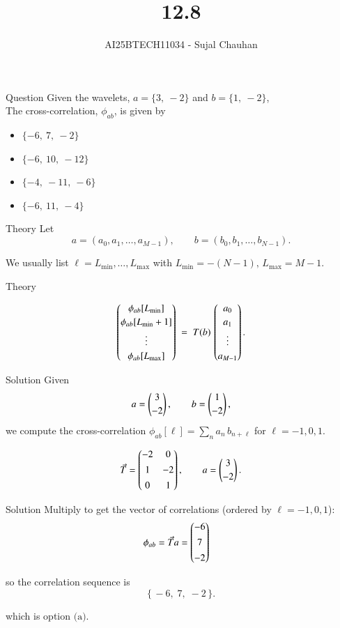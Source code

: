 \documentclass{beamer}
\title
{12.8}
\author 
{AI25BTECH11034 - Sujal Chauhan }
\begin{document}
\frame{\titlepage}
\begin{frame}{Question}
    Given the wavelets, $a = \{3,\ -2\}$ and $b = \{1,\ -2\}$,\\
The cross-correlation, $\phi_{ab}$, is given by

\begin{itemize}
  \item[(a)] $\{-6,\ 7,\ -2\}$
  \item[(b)] $\{-6,\ 10,\ -12\}$
  \item[(c)] $\{-4,\ -11,\ -6\}$
  \item[(d)] $\{-6,\ 11,\ -4\}$
\end{itemize}
\end{frame}
\begin{frame}{Theory}
Let
\[
a=(a_0,a_1,\dots,a_{M-1}),\qquad b=(b_0,b_1,\dots,b_{N-1}).
\]

 We usually list
\(\ell=L_{\min},\dots,L_{\max}\) with \(L_{\min}=-(N-1),\,L_{\max}=M-1\).

\bigskip
\end{frame}
\begin{frame}{Theory}
    

\[
\begin{pmatrix}\phi_{ab}[L_{\min}]\\[2pt]\phi_{ab}[L_{\min}+1]\\[2pt]\vdots\\[2pt]\phi_{ab}[L_{\max}]\end{pmatrix}
\;=\;T(b)\,\begin{pmatrix}a_0\\[2pt]a_1\\[2pt]\vdots\\[2pt]a_{M-1}\end{pmatrix}.
\]


\end{frame}


\begin{frame}{Solution}
Given
\[
a=\begin{pmatrix}3\\[2pt]-2\end{pmatrix},\qquad b=\begin{pmatrix}1\\[2pt]-2\end{pmatrix},
\]
we compute the cross-correlation
\(\phi_{ab}[\ell]=\sum_n a_n\,b_{n+\ell}\) for \(\ell=-1,0,1\).


\[
\Vec{T}=
\begin{pmatrix}


-2 & 0\\[4pt]
1 & -2\\[4pt]
0 & 1
\end{pmatrix},
\qquad
a=\begin{pmatrix}3\\[2pt]-2\end{pmatrix}.
\]
\end{frame}
\begin{frame}{Solution}
Multiply to get the vector of correlations (ordered by \(\ell=-1,0,1\)):
\begin{align*}
\phi_{ab}
&= \Vec{T}a
=
\begin{pmatrix}-6\\[4pt]7\\[4pt]-2\end{pmatrix}
\end{align*}


so the correlation sequence  is
\[
\{\,-6,\;7,\;-2\,\}.
\]

which is option \(\boxed{\text{(a)}}\).
\end{frame}
\end{document}
